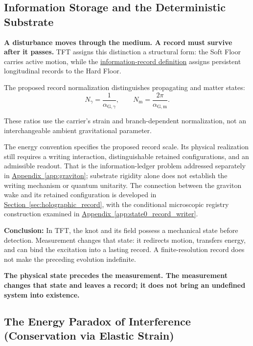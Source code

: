 \subsection{Information Storage and the Deterministic Substrate}

\textbf{A disturbance moves through the medium. A record must survive after it passes.} TFT assigns this distinction a structural form: the Soft Floor carries active motion, while the \hyperref[def:definition_five]{information-record definition} assigns persistent longitudinal records to the Hard Floor.

The proposed record normalization distinguishes propagating and matter states:
\begin{equation}
    N_\gamma
    =
    \frac{1}{\alpha_{\mathrm G,\gamma}},
    \qquad
    N_{\mathrm m}
    =
    \frac{2\pi}{\alpha_{\mathrm G,\mathrm m}}.
\end{equation}

These ratios use the carrier's strain and branch-dependent normalization, not an interchangeable ambient gravitational parameter.

The energy convention specifies the proposed record scale. Its physical realization still requires a writing interaction, distinguishable retained configurations, and an admissible readout. That is the information-ledger problem addressed separately in \hyperref[app:graviton]{Appendix~\ref*{app:graviton}}; substrate rigidity alone does not establish the writing mechanism or quantum unitarity.
The connection between the graviton wake and its retained
configuration is developed in
\hyperref[sec:holographic_record]
{Section~\ref*{sec:holographic_record}},
with the conditional microscopic registry construction examined in
\hyperref[app:state0_record_writer]
{Appendix~\ref*{app:state0_record_writer}}.

\medskip
\noindent\textbf{Conclusion:}
In TFT, the knot and its field possess a mechanical state before detection. Measurement changes that state: it redirects motion, transfers energy, and can bind the excitation into a lasting record. A finite-resolution record does not make the preceding evolution indefinite.

\textbf{The physical state precedes the measurement. The measurement changes that state and leaves a record; it does not bring an undefined system into existence.}

\subsection{The Energy Paradox of Interference (Conservation via Elastic Strain)}

